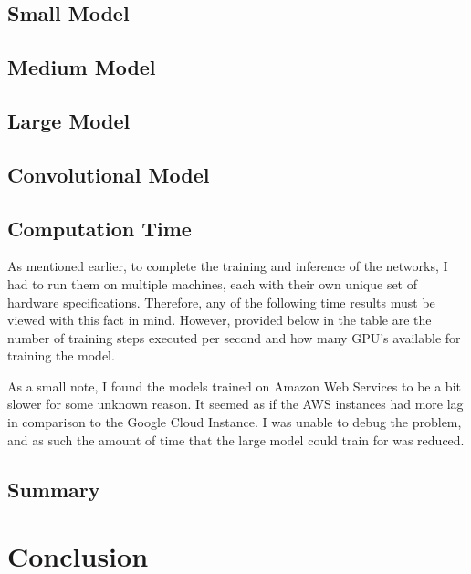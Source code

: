 \documentclass[pageno]{jpaper}
\begin{document}
\subsection{Small Model}

\subsection{Medium Model}

\subsection{Large Model}

\subsection{Convolutional Model}

\subsection{Computation Time}
As mentioned earlier, to complete the training and inference of the networks, I had to run them on multiple machines, each with their own unique set of hardware specifications.  Therefore, any of the following time results must be viewed with this fact in mind.  However, provided below in the table are the number of training steps executed per second and how many GPU's available for training the model.


\par
As a small note, I found the models trained on Amazon Web Services to be a bit slower for some unknown reason.  It seemed as if the AWS instances had more lag in comparison to the Google Cloud Instance.  I was unable to debug the problem, and as such the amount of time that the large model could train for was reduced.  

\subsection{Summary}

\section{Conclusion}
\end{document}
